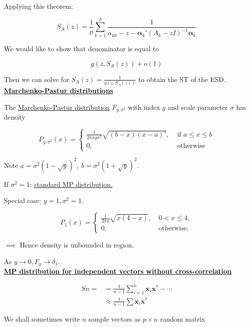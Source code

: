 \documentclass[twoside]{article}
\begin{document}
Applying this theorem:

\begin{equation}
	S_A(z)=\frac{1}{p}\sum^p_{k=1}\frac{1}{\alpha_{kk}-z-\mathbf{\alpha}_k'(A_k-zI)^{-1}\mathbf{\alpha}_k}
\end{equation}

We would like to show that denominator is equal to

$$g(z, S_A(z))+ o(1)$$

Then we can solve for $S_A(z)=\frac{1}{g(z, S_A(z))}$ to obtain the ST of the ESD.\\

\underline{\textbf{Marchenko-Pastur distributions}}

The \underline{Marchenko-Pastur distribution} $F_{y,\sigma^2}$ with index $y$ and scale parameter $\sigma$ has density

$$P_{y,\sigma^2}(x)=\begin{cases}
	\frac{1}{2\pi xy\sigma^2}\sqrt{(b-x)(x-a)'},&\text{ if } a\leq x\leq b\\
	0,&\text{ otherwise }
\end{cases}$$

Note $a=\sigma^2(1-\sqrt{y})^2,\ b=\sigma^2(1+\sqrt{y})^2$.

If $\sigma^2=1$: \underline{standard MP distribution.}

Special case: $y=1, \sigma^2=1$.

$$P_1(x)=\begin{cases}
	\frac{1}{2\pi x}\sqrt{x(4-x)},&\ 0<x\leq 4,\\
	0,&\ \text{otherwise}.
\end{cases}$$

$\implies$ Hence density is unbounded in region.

As $y\to 0, F_y\to \delta_1$.\\

\underline{\textbf{MP distribution for independent vectors without cross-correlation}}

\begin{equation}
	\begin{split}
		Sn=&=\frac{1}{n-1}\sum^n_{i=1}\mathbf{x}_i\mathbf{x}^*-\cdots\\
		&\approx\frac{1}{n-1}\sum\mathbf{x}_i\mathbf{x}^*
	\end{split}
\end{equation}

We shall sometimes write $n$ sample vectors as $p\times n$ random matrix
\end{document}
